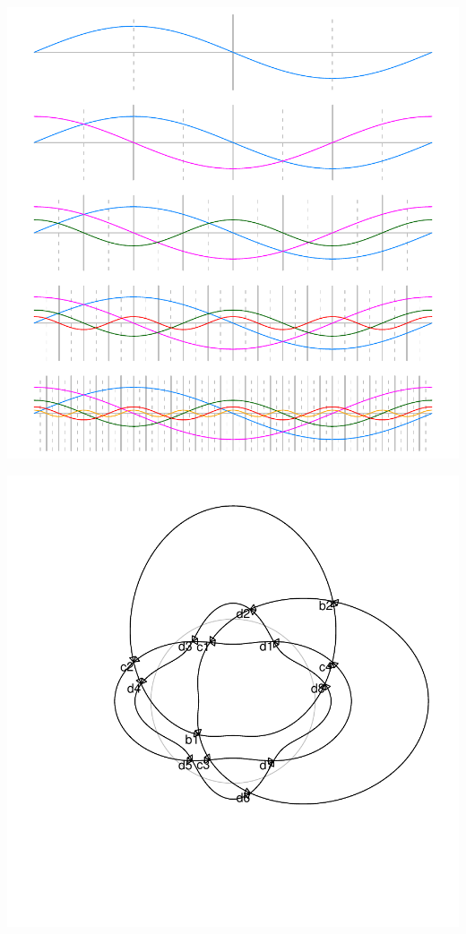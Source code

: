 \documentclass[a4paper]{article}
\begin{document}
\includegraphics{Vennfig-rfdovpsp}


\includegraphics{Vennfig-rfdovpsp4}






\end{document}
